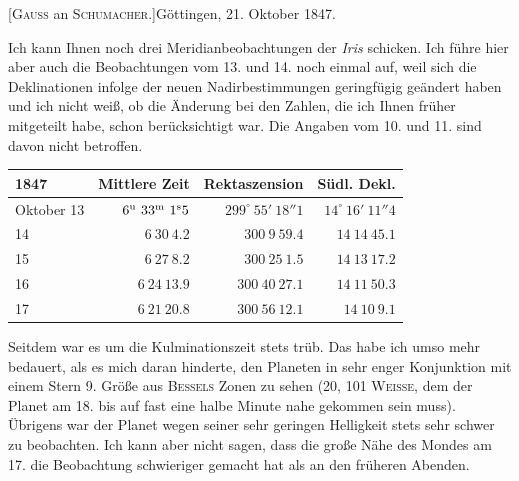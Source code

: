 \clearpage
\hypertarget{native-480-october21}{}
\begin{center}[\textsc{Gauss} an \textsc{Schumacher}.]\quad Göttingen, 21. Oktober 1847.\end{center}

Ich kann Ihnen noch drei Meridianbeobachtungen der \emph{Iris} schicken. Ich führe hier aber auch die Beobachtungen vom 13. und 14. noch einmal auf, weil sich die Deklinationen infolge der neuen Nadirbestimmungen geringfügig geändert haben und ich nicht weiß, ob die Änderung bei den Zahlen, die ich Ihnen früher mitgeteilt habe, schon berücksichtigt war. Die Angaben vom 10. und 11. sind davon nicht betroffen.

\begin{center}
\setlength{\tabcolsep}{4pt}
\begin{tabular}{l|r|r|r}
1847 & Mittlere Zeit & Rektaszension & Südl. Dekl. \\\hline
Oktober 13 & $6^{\rm u}\ 33^{\rm m}\ 1^{\rm s}5$ & $299^\circ\ 55'\ 18''1$ & $14^\circ\ 16'\ 11''4$ \\
\hfill 14 & $6\ 30\ 4.2$ & $300\ 9\ 59.4$ & $14\ 14\ 45.1$ \\
\hfill 15 & $6\ 27\ 8.2$ & $300\ 25\ 1.5$ & $14\ 13\ 17.2$ \\
\hfill 16 & $6\ 24\ 13.9$ & $300\ 40\ 27.1$ & $14\ 11\ 50.3$ \\
\hfill 17 & $6\ 21\ 20.8$ & $300\ 56\ 12.1$ & $14\ 10\ 9.1$ \\
\end{tabular}
\end{center}

Seitdem war es um die Kulminationszeit stets trüb. Das habe ich umso mehr bedauert, als es mich daran hinderte, den Planeten in sehr enger Konjunktion mit einem Stern 9. Größe aus \textsc{Bessels} Zonen zu sehen (20, 101 \textsc{Weisse}, dem der Planet am 18. bis auf fast eine halbe Minute nahe gekommen sein muss). Übrigens war der Planet wegen seiner sehr geringen Helligkeit stets sehr schwer zu beobachten. Ich kann aber nicht sagen, dass die große Nähe des Mondes am 17. die Beobachtung schwieriger gemacht hat als an den früheren Abenden.